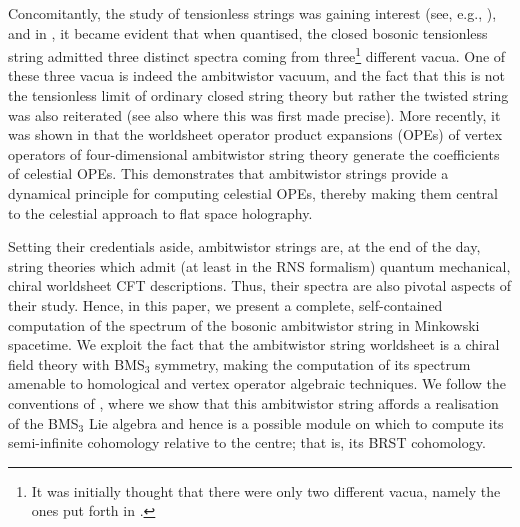 \documentclass[11pt,reqno,a4paper,final]{amsart}
\theoremstyle{plain}
\theoremstyle{definition}
\newcommand{\1}{\mathbb{1}}
\numberwithin{equation}{section}
\begin{document}
Concomitantly, the study of tensionless strings was gaining interest
(see, e.g., \cite{Bagchi:2013bga, Bagchi:2015nca, Bagchi:2016yyf}),
and in \cite{Bagchi:2020fpr}, it became evident that when quantised,
the closed bosonic tensionless string admitted three distinct spectra
coming from three\footnote{It was initially thought
  that there were only two different vacua, namely the ones put forth
  in \cite{Gamboa:1989px}.} different vacua. One of these three vacua
is indeed the ambitwistor vacuum, and the fact that this is not the
tensionless limit of ordinary closed string theory but rather the
twisted string was also reiterated (see also \cite{Casali:2016atr}
where this was first made precise). More recently, it was shown in
\cite{Adamo:2021zpw, Adamo:2022wjo} that the worldsheet operator
product expansions (OPEs) of vertex operators of four-dimensional
ambitwistor string theory generate the coefficients of celestial OPEs.
This demonstrates that ambitwistor strings provide a dynamical
principle for computing celestial OPEs, thereby making them central to
the celestial approach to flat space holography.

Setting their credentials aside, ambitwistor strings are, at the end
of the day, string theories which admit (at least in the RNS
formalism) quantum mechanical, chiral worldsheet CFT descriptions.
Thus, their spectra are also pivotal aspects of their study. Hence, in
this paper, we present a complete, self-contained computation of the
spectrum of the bosonic ambitwistor string in Minkowski spacetime. We
exploit the fact that the ambitwistor string worldsheet is a chiral
field theory with BMS$_3$ symmetry, making the computation of its
spectrum amenable to homological and vertex operator algebraic
techniques. We follow the conventions of
\cite{Figueroa-OFarrill:2024wgs}, where we show that this ambitwistor
string affords a realisation of the BMS$_3$ Lie algebra and hence is a possible module on which to compute its semi-infinite cohomology relative to the centre; that is, its BRST cohomology.
\end{document}
